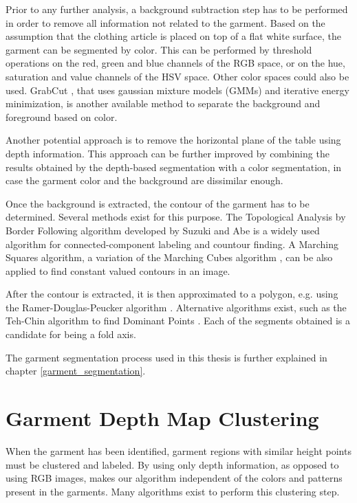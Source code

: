 Prior to any further analysis, a background subtraction step has to be performed in order to remove all information not related to the garment. Based on the assumption that the clothing article is placed on top of a flat white surface, the garment can be segmented by color. This can be performed by threshold operations on the red, green and blue channels of the RGB space, or on the hue, saturation and value channels of the HSV space. Other color spaces could also be used. GrabCut \cite{rother2004grabcut}, that uses gaussian mixture models (GMMs) and iterative energy minimization, is another available method to separate the background and foreground based on color.

Another potential approach is to remove the horizontal plane of the table using depth information. This approach can be further improved by combining the results obtained by the depth-based segmentation with a color segmentation, in case the garment color and the background are dissimilar enough.

Once the background is extracted, the contour of the garment has to be determined. Several methods exist for this purpose. The Topological Analysis by Border Following algorithm developed by Suzuki and Abe \cite{suzuki1985topological} is a widely used algorithm for connected-component labeling and countour finding. A Marching Squares algorithm, a variation of the Marching Cubes algorithm \cite{lorensen1987marching}, can be also applied to find constant valued contours in an image.

After the contour is extracted, it is then approximated to a polygon, e.g. using the Ramer-Douglas-Peucker algorithm \cite{ramer1972iterative, douglas1973algorithms}. Alternative algorithms exist, such as the Teh-Chin algorithm to find Dominant Points \cite{teh1989detection}. Each of the segments obtained is a candidate for being a fold axis.

The garment segmentation process used in this thesis is further explained in chapter \ref{garment_segmentation}.

\section{Garment Depth Map Clustering}
\label{architecture:depth_map_clustering}
When the garment has been identified, garment regions with similar height points must be clustered and labeled. By using only depth information, as opposed to using RGB images, makes our algorithm independent of the colors and patterns present in the garments. Many algorithms exist to perform this clustering step.

